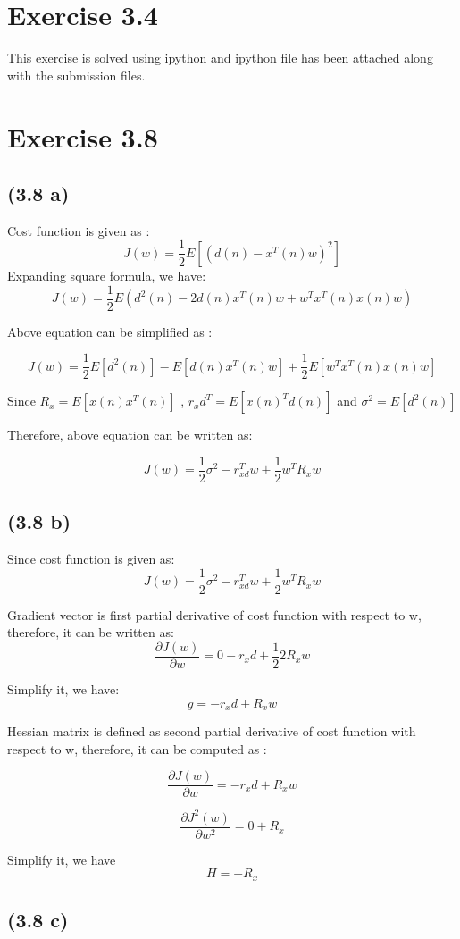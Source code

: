 \documentclass[12pt]{article}
\begin{document}
\section{ Exercise 3.4}
This exercise is solved using ipython and ipython file has been attached along with the submission files.
\section{ Exercise 3.8}
\subsection{(3.8 a)} 
Cost function is given as : $$ J(w) = \frac{1}{2} E[(d(n) - x^T(n)w )^2 ]$$ 
Expanding square formula, we have: $$ J(w) = \frac{1}{2} E( d^2(n) - 2d(n) x^T(n) w  + w^T x^T(n) x(n) w ) $$ 

Above equation can be simplified as : 

$$ J(w) = \frac{1}{2} E[d^2(n)] - E[d(n) x^T(n) w ] + \frac{1}{2} E[w^T x^T(n) x(n) w]    $$

Since $ R_x = E[x(n) x^T(n)] $ , $r_xd^T = E[x(n)^T d(n)]$ and $ \sigma^2 = E[d^2(n)] $ 

Therefore, above equation can be written as:

$$ J(w) = \frac{1}{2} \sigma^2 - r_{xd}^T w + \frac{1}{2} w^T R_x w $$


\subsection{(3.8 b)}

Since cost function is given as: $$ J(w) = \frac{1}{2} \sigma^2 - r_{xd}^T w + \frac{1}{2} w^T R_x w $$

Gradient vector is first partial derivative of cost function with respect to w, therefore, it can be written as: 
	$$ \frac{\partial J(w)}{\partial w} = 0 - r_xd + \frac{1}{2} 2 R_x w $$

Simplify it, we have: $$ g = -r_xd + R_xw $$ 

Hessian matrix is defined as second partial derivative of cost function with respect to w, therefore, it can be computed as :

	$$ \frac{\partial J(w)}{\partial w} = -r_xd + R_xw  $$

		$$ \frac{\partial J^2(w)}{\partial w^2} = 0 + R_x $$
		
Simplify it, we have $$H = -R_x $$

\subsection{(3.8 c)}
\end{document}

